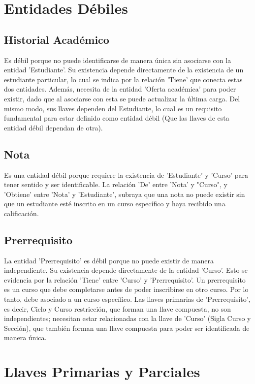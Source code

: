 \documentclass[12pt]{article}
\begin{document}
\section*{Entidades Débiles}
\subsection*{Historial Académico}
Es débil porque no puede identificarse de manera única sin asociarse con la entidad 'Estudiante'. 
Su existencia depende directamente de la existencia de un estudiante particular, lo cual se indica por la relación 'Tiene' 
que conecta estas dos entidades. Además, necesita de la entidad 'Oferta académica' 
para poder existir, dado que al asociarse con esta se puede actualizar la última carga. Del mismo modo, sus llaves dependen del Estudiante, lo cual es un requisito fundamental para estar definido como entidad débil 
(Que las llaves de esta entidad débil dependan de otra). 

\subsection*{Nota}
Es una entidad débil porque requiere la existencia de 'Estudiante' y 'Curso' 
para tener sentido y ser identificable. La relación 'De' entre 'Nota' y "Curso", y 'Obtiene' entre 'Nota' y 'Estudiante', 
subraya que una nota no puede existir sin que un estudiante esté inscrito en un curso específico y haya recibido una calificación. 

\subsection*{Prerrequisito}
La entidad 'Prerrequisito' es débil porque no puede existir de manera independiente. 
Su existencia depende directamente de la entidad 'Curso'. Esto se evidencia por la relación 'Tiene' entre 'Curso' y 'Prerrequisito'. 
Un prerrequisito es un curso que debe completarse antes de poder inscribirse en otro curso. Por lo tanto, debe asociado a 
un curso específico. Las llaves primarias de 'Prerrequisito', es decir, Ciclo y Curso restricción, que forman una llave compuesta, no son independientes; 
necesitan estar relacionadas con la llave de 'Curso' (Sigla Curso y Sección), que también forman una llave compuesta 
para poder ser identificada de manera única.  

\newpage
\section*{Llaves Primarias y Parciales}
\end{document}
